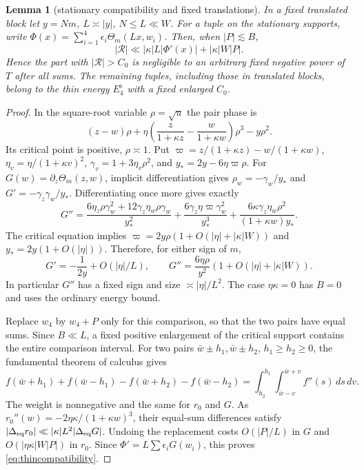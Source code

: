 \documentclass[11pt]{amsart}
\numberwithin{equation}{section}
\newtheorem{lemma}[theorem]{Lemma}
\begin{document}
\begin{lemma}[stationary compatibility and fixed translations]
\label{lem:thincompatibility}
In a fixed translated block let $y=Nm$, $L\asymp|y|$, $N\le L\ll W$.
For a tuple on the stationary supports, write
$\Phi(x)=\sum_{i=1}^4\epsilon_i\Theta_m(Lx,w_i)$.
Then, when $|P|\lesssim B$,
\begin{equation}\label{eq:thincompatibility}
 |\mathcal R|\ll |\kappa|L|\Phi'(x)|+|\kappa|W|P|.
\end{equation}
Hence the part with $|\mathcal R|>C_0$ is negligible to an arbitrary
fixed negative power of $T$ after all sums. The remaining tuples,
including those in translated blocks, belong to the thin
energy $E_4^\flat$ with a fixed enlarged $C_0$.
\end{lemma}
\begin{proof}
In the square-root variable $\rho=\sqrt u$ the pair phase is
\[
 (z-w)\rho+\eta\left(\frac z{1+\kappa z}
                    -\frac w{1+\kappa w}\right)\rho^3-y\rho^2.
\]
Its critical point is positive, $\rho\asymp1$. Put
$\varpi=z/(1+\kappa z)-w/(1+\kappa w)$,
$\eta_v=\eta/(1+\kappa v)^2$,
$\gamma_v=1+3\eta_v\rho^2$, and
$y_*=2y-6\eta\varpi\rho$.
For $G(w)=\partial_z\Theta_m(z,w)$, implicit differentiation gives
$\rho_w=-\gamma_w/y_*$ and $G'=-\gamma_z\gamma_w/y_*$.
Differentiating once more gives exactly
\[
 G''=\frac{6\eta_z\rho\gamma_w^2+12\gamma_z\eta_w\rho\gamma_w}{y_*^2}
       +\frac{6\gamma_z\eta\varpi\gamma_w^2}{y_*^3}
       +\frac{6\kappa\gamma_z\eta_w\rho^2}{(1+\kappa w)y_*}.
\]
The critical equation implies
$\varpi=2y\rho(1+O(|\eta|+|\kappa|W))$ and
$y_*=2y(1+O(|\eta|))$. Therefore, for either sign of $m$,
\[
 G'=-\frac1{2y}+O(|\eta|/L),\qquad
 G''=\frac{6\eta\rho}{y^2}
                     (1+O(|\eta|+|\kappa|W)).
\]
In particular $G''$ has a fixed sign and size $\asymp|\eta|/L^2$.
The case $\eta\kappa=0$ has $B=0$ and uses the ordinary energy bound.

Replace $w_4$ by $w_4+P$ only for this comparison, so that the two
pairs have equal sums. Since $B\ll L$, a fixed positive enlargement
of the critical support contains the entire comparison interval.
For two pairs $\bar w\pm h_1,\bar w\pm h_2$, $h_1\ge h_2\ge0$, the
fundamental theorem of calculus gives
\[
 f(\bar w+h_1)+f(\bar w-h_1)-f(\bar w+h_2)-f(\bar w-h_2)
       =\int_{h_2}^{h_1}\int_{\bar w-v}^{\bar w+v}f''(s)\,ds\,dv.
\]
The weight is nonnegative and the same for $r_0$ and $G$.
As $r_0''(w)=-2\eta\kappa/(1+\kappa w)^3$, their equal-sum
differences satisfy
$|\Delta_{\rm eq}r_0|\ll|\kappa|L^2|\Delta_{\rm eq}G|$.
Undoing the replacement costs $O(|P|/L)$ in $G$ and
$O(|\eta\kappa|W|P|)$ in $r_0$. Since
$\Phi'=L\sum\epsilon_iG(w_i)$, this proves
\eqref{eq:thincompatibility}.


\end{proof}
\end{document}
